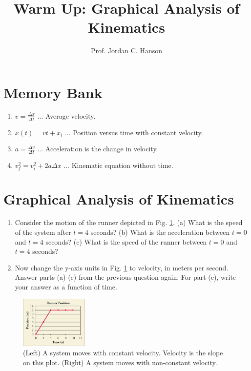 \documentclass{article}
\begin{document}
\title{Warm Up: Graphical Analysis of Kinematics}
\author{Prof. Jordan C. Hanson}

\maketitle

\section{Memory Bank}

\begin{enumerate}
\item $v = \frac{\Delta x}{\Delta t}$ ... Average velocity.
\item $x(t) = v t + x_i$ ... Position versus time with constant velocity.
\item $a = \frac{\Delta v}{\Delta t}$ ... Acceleration is the change in velocity.
\item $v_f^2 = v_i^2 + 2 a \Delta x$ ... Kinematic equation without time.
\end{enumerate}

\section{Graphical Analysis of Kinematics}

\begin{enumerate}
\item Consider the motion of the runner depicted in Fig. \ref{fig:1}.  (a) What is the speed of the system after $t = 4$ seconds? (b) What is the acceleration between $t=0$ and $t=4$ seconds? (c) What is the speed of the runner between $t=0$ and $t=4$ seconds? \\ \vspace{1cm}
\item Now change the y-axis units in Fig. \ref{fig:1} to velocity, in meters per second.  Answer parts (a)-(c) from the previous question again.  For part (c), write your answer as a function of time. \\ \vspace{4cm}
\end{enumerate} 

\begin{figure}[hb]
\centering
\includegraphics[width=0.3\textwidth]{figures/run.jpeg}
\caption{\label{fig:1} (Left) A system moves with constant velocity.  Velocity is the slope on this plot. (Right) A system moves with non-constant velocity.}
\end{figure}
\end{document}
